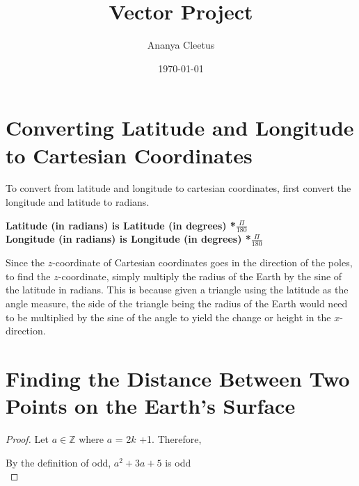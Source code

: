 \documentclass[a4paper]{article}
\begin{document}
\title{Vector Project}

\author{Ananya Cleetus}

\date{\today}



\maketitle

\section{Converting Latitude and Longitude to Cartesian Coordinates }

To convert from latitude and longitude to cartesian coordinates, first convert the longitude and latitude to radians. 

\begin{center}
\textbf{Latitude (in radians) is Latitude (in degrees) *$\frac{\Pi}{180}$}\\
\textbf{Longitude (in radians) is Longitude (in degrees) *$\frac{\Pi} {180}$}\\
\end{center}

Since the $z$-coordinate of Cartesian coordinates goes in the direction of the poles, to find the $z$-coordinate, simply multiply the radius of the Earth by the sine of the latitude in radians. This is because given a triangle using the latitude as the angle measure, the side of the triangle being the radius of the Earth would need to be multiplied by the sine of the angle to yield the change or height in the $x$-direction.

\section{Finding the Distance Between Two Points on the Earth’s Surface}

\begin{proof}

 Let $a \in \mathbb{Z}$ where $a$ = 2$k$ +1. Therefore,



  By the definition of odd, $a^2+3a+5$ is odd \\
 
\end{proof}
\end{document}
